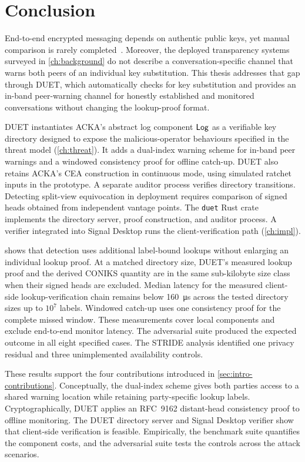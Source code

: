 \chapter{Conclusion}\label{ch:conclusion}

End-to-end encrypted messaging depends on authentic public keys, yet manual comparison is rarely
completed~\cite{vaziripour2017}. Moreover, the deployed transparency systems surveyed in
\cref{ch:background} do not describe a conversation-specific channel that warns both peers of an
individual key substitution. This thesis addresses that gap through DUET, which automatically
checks for key substitution and provides an in-band peer-warning channel for honestly established
and monitored conversations without changing the lookup-proof format.

DUET instantiates ACKA's abstract log component $\mathsf{Log}$ as a verifiable key directory designed to
expose the malicious-operator behaviours specified in the threat model (\cref{ch:threat}). It adds a
dual-index warning scheme for in-band peer
warnings and a windowed consistency proof for offline catch-up. DUET also retains ACKA's CEA
construction in continuous mode, using simulated ratchet inputs in the prototype. A separate auditor
process verifies directory transitions. Detecting split-view equivocation in deployment requires
comparison of signed heads obtained from independent vantage points. The \texttt{duet} Rust crate
implements the directory server, proof construction, and auditor process. A verifier integrated into Signal Desktop runs the client-verification path
(\cref{ch:impl}).

 shows that detection uses additional label-bound lookups without enlarging an
individual lookup proof. At a matched directory size, DUET's measured lookup proof and the derived CONIKS quantity are in the
same sub-kilobyte size class when their signed heads are excluded. Median latency for the measured
client-side lookup-verification chain remains below \SI{160}{\micro\second} across the tested
directory sizes up to $10^7$ labels. Windowed catch-up uses one consistency
proof for the complete missed window. These measurements cover local components and exclude
end-to-end monitor latency. The adversarial suite produced the expected outcome in all eight specified cases. The STRIDE analysis identified one privacy residual and three unimplemented
availability controls.

These results support the four contributions introduced in \cref{sec:intro-contributions}.
Conceptually, the dual-index scheme gives both parties access to a shared warning location while
retaining party-specific lookup labels. Cryptographically, DUET applies an RFC~9162
distant-head consistency proof to offline monitoring. The DUET directory server and Signal Desktop verifier show that client-side verification is feasible. Empirically, the benchmark suite quantifies the component costs, and the adversarial suite tests the
controls across the attack scenarios.


